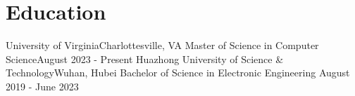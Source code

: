 \section{Education}
  \resumeSubHeadingListStart
    
    \resumeSubheading
      {University of Virginia}{Charlottesville, VA}
      {Master of Science in Computer Science}{August 2023 - Present}
        \resumeItemListStart
        \resumeItemListEnd
    \resumeSubheading
      {Huazhong University of Science \& Technology}{Wuhan, Hubei}
      {Bachelor of Science in Electronic Engineering }{August 2019 - June 2023}
        \resumeItemListStart
        \resumeItemListEnd
  \resumeSubHeadingListEnd